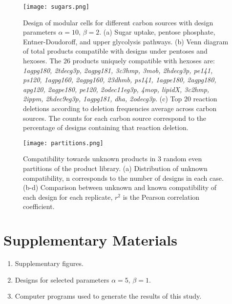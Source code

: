 \documentclass[12pt]{article}
\begin{document}
{\begin{figure}[H]
    \caption{Design of modular cells for different carbon sources with design parameters $\alpha=10, \, \beta=2$. (a) Sugar uptake, pentose phosphate, Entner-Doudoroff, and upper glycolysis pathways. (b) Venn diagram of total products compatible with designs under pentoses and hexoses.
    The 26 products uniquely compatible with hexoses are:
    \textit{1agpg180, 2tdecg3p, 2agpg181, 3c3hmp, 3mob, 2hdecg3p, pe141, ps120, 1agpg160, 2agpg160, 23dhmb, ps141, 1agpe180, 2agpg180, apg120, 2agpe180, pe120, 2odec11eg3p, 4mop, lipidX, 3c2hmp, 2ippm, 2hdec9eg3p, 1agpg181, dha, 2odecg3p}.
    (c) Top 20 reaction deletions according to deletion frequencies average across carbon sources. The counts for each carbon source correspond to the percentage of designs containing that reaction deletion.}
    \centering
    \texttt{[image: sugars.png]}
    \label{fig7:sugars}
\end{figure}

\begin{figure}[H]
    \caption{Compatibility towards unknown products in 3 random even partitions of the product library. (a) Distribution of unknown compatibility, n corresponds to the number of designs in each case. (b-d) Comparison between unknown and known compatibility of each design for each replicate, $r^2$ is the Pearson correlation coefficient.}
    \centering
    \texttt{[image: partitions.png]}
    \label{fig7:partitions}
\end{figure}

\printbibliography


\section*{Supplementary Materials}
\begin{enumerate}%
    \item Supplementary figures. \label{sm:figures}
    \item Designs for selected parameters $\alpha=5,\,\beta=1$. \label{sm:designs}
    \item Computer programs used to generate the results of this study. \label{sm:code}
\end{enumerate}


}
\end{document}
